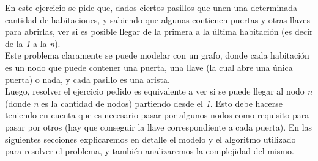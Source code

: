
En este ejercicio se pide que, dados ciertos pasillos que unen una determinada cantidad de habitaciones, y sabiendo que algunas contienen puertas y otras llaves para abrirlas, ver si es posible llegar de la primera a la última habitación (es decir de la \textit{1} a la \textit{n}). \\

Este problema claramente se puede modelar con un grafo, donde cada habitación es un nodo que puede contener una puerta, una llave (la cual abre una única puerta) o nada, y cada pasillo es una arista. \\

Luego, resolver el ejercicio pedido es equivalente a ver si se puede llegar al nodo \textit{n} (donde \textit{n} es la cantidad de nodos) partiendo desde el \textit{1}. Esto debe hacerse teniendo en cuenta que es necesario pasar por algunos nodos como requisito para pasar por otros (hay que conseguir la llave correspondiente a cada puerta).
En las siguientes secciones explicaremos en detalle el modelo y el algoritmo utilizado para resolver el problema, y también analizaremos la complejidad del mismo. \\